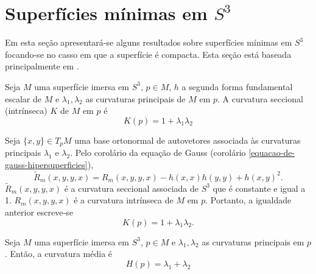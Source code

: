 \section{Superfícies mínimas em $S^3$}

Em esta seção apresentará-se alguns resultados sobre superfícies mínimas em $S^3$ focando-se no casso em que a superfície é compacta. Esta seção está baseada principalmente em \cite{Brendle2013}.


\begin{proposicao}
	Seja $M$ uma superfície imersa em $S^3$,
	$p \in M$,
	$h$ a segunda forma fundamental escalar de $M$ e
	$\lambda_1, \lambda_2$ as curvaturas principais de $M$ em $p$.
	A curvatura seccional (intrínseca) $K$ de $M$ em $p$ é
	\begin{equation*}
		K(p) = 1 + \lambda_1 \lambda_2
	\end{equation*}
\end{proposicao}

\begin{demonstracao}
	Seja $\{x,y\} \in T_p M$ uma base ortonormal de autovetores associada às curvaturas principais $\lambda_1$ e $\lambda_2$.
	Pelo corolário da equação de Gauss (corolário \ref{equacao-de-gauss-hipersuperficies}),
	\begin{equation*}
		\tilde{R}_m(x,y,y,x) = R_m(x,y,y,x) - h(x,x) h(y,y) + h(x,y)^2.
	\end{equation*}
	$\tilde{R}_m(x,y,y,x)$ é a curvatura seccional associada de $S^3$ que é constante e igual a 1. 
	$R_m(x,y,y,x)$ é a curvatura intrínseca de $M$ em $p$. Portanto, a igualdade anterior escreve-se
	\begin{equation*}
		K(p) = 1 + \lambda_1 \lambda_2.
	\end{equation*}
\end{demonstracao}



\begin{proposicao}
	Seja $M$ uma superfície imersa em $S^3$,
	$p \in M$ e
	$\lambda_1, \lambda_2$ as curvaturas principais em $p$.
	Então, a curvatura média é
	\begin{equation*}
		H(p) = \lambda_1 + \lambda_2
	\end{equation*}
\end{proposicao}

